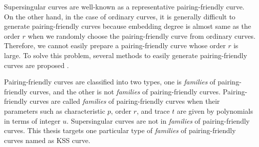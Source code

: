 Supersingular curves are well-known as a representative pairing-friendly curve.
On the other hand, in the case of ordinary curves, it is generally difficult to generate pairing-friendly curves because embedding degree is almost same as the order $r$ when we randomly choose the pairing-friendly curve from ordinary curves.
Therefore, we cannot easily prepare a pairing-friendly curve whose order $r$ is large.
To solve this problem, several methods to easily generate pairing-friendly curves are proposed \cite{JC:FreScoTes10}.

Pairing-friendly curves are classified into two types, one is {\it families} of pairing-friendly curves, and the other is not {\it families} of pairing-friendly curves.
Pairing-friendly curves are called {\it families} of pairing-friendly curves when their parameters such as characteristic $p$, order $r$, and trace $t$ are given by polynomials in terms of integer $u$.
Supersingular curves are not in {\it families} of pairing-friendly curves.
This thesis targets one particular type of {\it families} of pairing-friendly curves named as KSS curve.

%
% 
%
%
